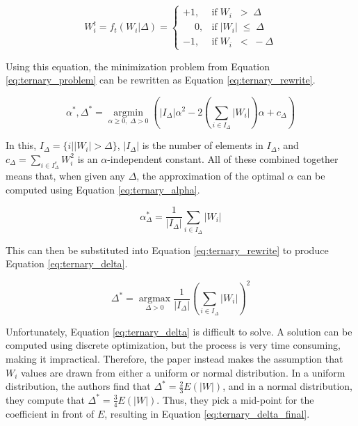 \documentclass[11pt,a4paper,oldfontcommands]{memoir}
\DeclareMathOperator*{\argmin}{argmin}
\DeclareMathOperator*{\argmax}{argmax}
\begin{document}
\begin{equation}
W_i^t = f_t(W_i|\Delta) = 
    \begin{cases} 
        +1, & \textrm{if} \;W_i\phantom{|} \; > \; \Delta \\
        \phantom{-}0, & \textrm{if} \;|W_i| \; \leq \; \Delta\\
        -1, & \textrm{if} \; W_i\phantom{|} \; < \; -\Delta 
    \end{cases}
\label{eq:ternary_threshold}
\end{equation}

Using this equation, the minimization problem from Equation \ref{eq:ternary_problem} can be rewritten as Equation \ref{eq:ternary_rewrite}.

\begin{equation}
\alpha^*,\Delta^* = \argmin\limits_{\alpha \geq 0, \; \Delta > 0} (|I_\Delta|\alpha^2 - 2(\sum\limits_{i \in I_\Delta} |W_i|)\alpha + c_\Delta)
\label{eq:ternary_rewrite}
\end{equation}

In this, $I_\Delta = \{i \big| |W_i| > \Delta\}$, $|I_\Delta|$ is the number of elements in $I_\Delta$, and $c_\Delta = \sum\limits_{i \in I^c_\Delta} W_i^2$ is an $\alpha$-independent constant. All of these combined together means that, when given any $\Delta$, the approximation of the optimal $\alpha$ can be computed using Equation \ref{eq:ternary_alpha}.

\begin{equation}
\alpha^*_\Delta = \frac{1}{|I_\Delta|}\sum\limits_{i \in I_\Delta} |W_i|
\label{eq:ternary_alpha}
\end{equation}

This can then be substituted into Equation \ref{eq:ternary_rewrite} to produce Equation \ref{eq:ternary_delta}.

\begin{equation}
\Delta^* = \argmax\limits_{\Delta > 0} \frac{1}{|I_\Delta|}(\sum\limits_{i \in I_\Delta} |W_i|)^2
\label{eq:ternary_delta}
\end{equation}

Unfortunately, Equation \ref{eq:ternary_delta} is difficult to solve. A solution can be computed using discrete optimization, but the process is very time consuming, making it impractical. Therefore, the paper \cite{ternary} instead makes the assumption that $W_i$ values are drawn from either a uniform or normal distribution. In a uniform distribution, the authors find that $\Delta^* = \frac{2}{3}E(|W|)$, and in a normal distribution, they compute that $\Delta^* = \frac{3}{4}E(|W|)$. Thus, they pick a mid-point for the coefficient in front of $E$, resulting in Equation \ref{eq:ternary_delta_final}.
\end{document}
